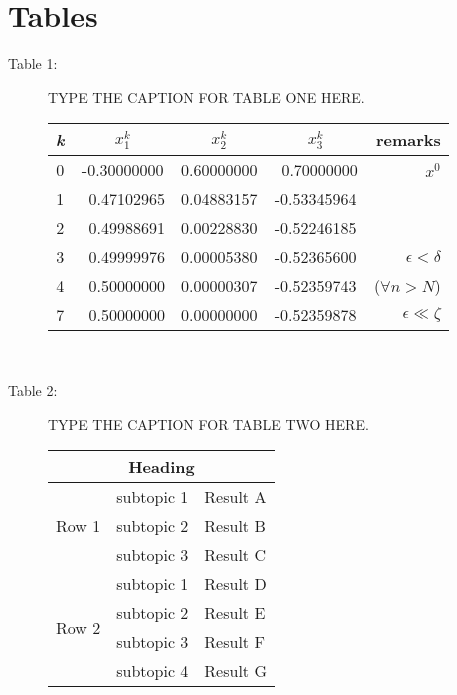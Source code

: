 \documentclass[review,authoryear,12pt]{elsarticle}
\begin{document}

\pagebreak

\section*{Tables}

\begin{description}
\item[Table 1:]  TYPE THE CAPTION FOR TABLE ONE HERE. \\

\begin{tabular}{|c||ccc||r|}
	\hline
\textbf{\em k}  &  $x_1^k$    &   $x_2^k$  & $x_3^k$ & remarks    \\
	\hline \hline
0   & -0.30000000 & 0.60000000 & ~0.70000000 & $x^0$ \\
1   & ~0.47102965 & 0.04883157 & -0.53345964 &   \\
2   & ~0.49988691 & 0.00228830 & -0.52246185 &   \\
3   & ~0.49999976 & 0.00005380 & -0.52365600 & $\epsilon<\delta$ \\
4   & ~0.50000000 & 0.00000307 & -0.52359743 & ($\forall n>N$) \\
	\hline
7   & ~0.50000000 & 0.00000000 & -0.52359878 & $\epsilon\ll\zeta$ \\
	\hline
\end{tabular} \\


\item[Table 2:]  TYPE THE CAPTION FOR TABLE TWO HERE. 

\begin{tabular}{|l|l|l|} \hline
\multicolumn{3}{|c|}{Heading} \\ \hline
\multirow{3}{*}{Row 1} & subtopic 1 & Result A \\
& subtopic 2 & Result B \\
& subtopic 3 & Result C \\ \hline
\multirow{4}{*}{Row 2} & subtopic 1 & Result D \\ 
& subtopic 2 & Result E \\
& subtopic 3 & Result F \\ 
& subtopic 4 & Result G \\ \hline
\end{tabular} \\

\end{description}
\end{document}
